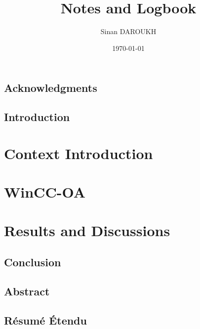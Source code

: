 \documentclass[a4paper, 12pt]{report}
\title{Notes and Logbook}
\author{Sinan DAROUKH}
\date{\today}
\begin{document}
\begin{titlepage}





\end{titlepage}


\renewcommand{\contentsname}{Table of contents}
\tableofcontents
\newpage
\renewcommand{\listfigurename}{Table of figures and illustrations}
\listoffigures
\newpage


\chapter*{Acknowledgments}

\chapter*{Introduction}


\part{Context Introduction}


\part{WinCC-OA}


\part{Results and Discussions}


\chapter*{Conclusion}


\chapter*{Abstract}


\chapter*{Résumé Étendu}

\end{document}
